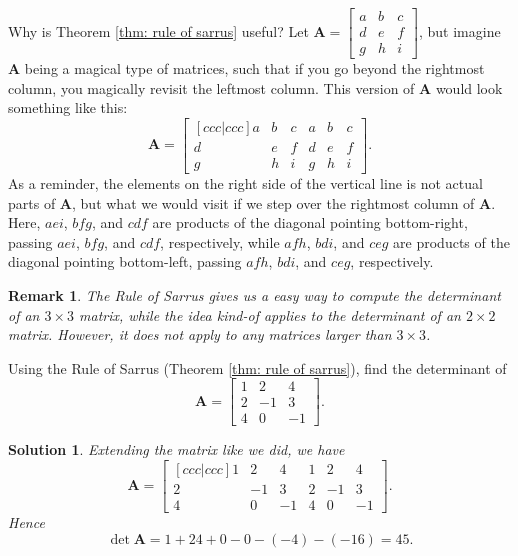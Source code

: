 \documentclass[]{book}
\newcommand{\mat}[1]{\ensuremath{\mathbf{#1}}}
\newtheorem*{solution}{Solution}
\newtheorem*{remark}{Remark}
\begin{document}
Why is Theorem \ref{thm: rule of sarrus} useful? Let $\mat{A} = \begin{bmatrix} a & b & c \\ d & e & f \\ g & h & i \end{bmatrix}$, but imagine $\mat{A}$ being a magical type of matrices, such that if you go beyond the rightmost column, you magically revisit the leftmost column. This version of $\mat{A}$ would look something like this:
\[\mat{A} = \begin{bmatrix}[ccc|ccc]a & b & c & a & b & c\\
d & e & f & d & e & f \\
g & h & i & g & h & i
\end{bmatrix}.\]
As a reminder, the elements on the right side of the vertical line is not actual parts of $\mat{A}$, but what we would visit if we step over the rightmost column of $\mat{A}$. Here, $aei$, $bfg$, and $cdf$ are products of the diagonal pointing bottom-right, passing $aei$, $bfg$, and $cdf$, respectively, while $afh$, $bdi$, and $ceg$ are products of the diagonal pointing bottom-left, passing $afh$, $bdi$, and $ceg$, respectively. 
\begin{remark}
The Rule of Sarrus gives us a easy way to compute the determinant of an $3 \times 3$ matrix, while the idea kind-of applies to the determinant of an $2 \times 2$ matrix. However, it does \emph{not} apply to any matrices larger than $3 \times 3$.
\end{remark}

\begin{example}
    \label{expl: find 3x3 determinant using rule of sarrus}
    Using the Rule of Sarrus (Theorem \ref{thm: rule of sarrus}), find the determinant of \[\mat{A} = \begin{bmatrix}1 & 2 & 4 \\ 2 & -1 & 3 \\ 4 & 0 & -1\end{bmatrix}.\]
\begin{solution}
    Extending the matrix like we did, we have
    \[\mat{A} = \begin{bmatrix}[ccc|ccc] 1 & 2 & 4 & 1 & 2 & 4 \\ 2 & -1 & 3 & 2 & -1 & 3 \\ 4 & 0 & -1 & 4 & 0 & -1 \end{bmatrix}.\]
    Hence \[\det\mat{A} = 1 + 24 + 0 - 0 - (-4) - (-16) = 45.\]
    \hfill \qedsymbol
\end{solution}
\end{example}
\end{document}
